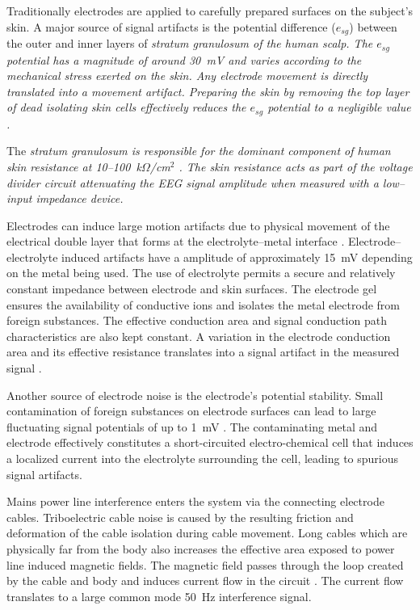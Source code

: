 Traditionally electrodes are applied to carefully prepared surfaces on
the subject's skin. A major source of signal artifacts is the
potential difference ($e_{sg}$) between the outer and inner layers of
\em stratum granulosum \em of the human scalp. The $e_{sg}$ potential has a
magnitude of around 30~mV \cite{reducing-motion-artifacts} and varies
according to the mechanical stress exerted on the skin. Any electrode
movement is directly translated into a movement artifact. Preparing
the skin by removing the top layer of dead isolating skin cells
effectively reduces the $e_{sg}$ potential to a negligible value
\cite{reducing-motion-artifacts}. 


The \em stratum granulosum \em is responsible for the dominant
component of human skin resistance at 10--100~k$\Omega$/cm$^{2}$
\cite{active-electrode-ca}. The skin resistance acts as part of the
voltage divider circuit attenuating the EEG signal amplitude when
measured with a low--input impedance device. 


Electrodes can induce large motion artifacts due to physical movement
of the electrical double layer that forms at the electrolyte--metal
interface \cite{reducing-motion-artifacts}.  Electrode--electrolyte
induced artifacts have a amplitude of approximately 15~mV depending on
the metal being used. The use of electrolyte permits a secure and
relatively constant impedance between electrode and skin surfaces. The
electrode gel ensures the availability of conductive ions and isolates
the metal electrode from foreign substances. The effective conduction
area and signal conduction path characteristics are also kept
constant. A variation in the electrode conduction area and its
effective resistance translates into a signal artifact in the measured
signal \cite{reducing-motion-artifacts}.


Another source of electrode noise is the electrode's potential
stability. Small contamination of foreign substances on electrode
surfaces can lead to large fluctuating signal potentials of up to 1~mV
\cite{electrode-stability}. The contaminating metal and electrode
effectively constitutes a short-circuited electro-chemical cell that
induces a localized current into the electrolyte surrounding the cell,
leading to spurious signal artifacts.


Mains power line interference enters the system via the connecting
electrode cables. Triboelectric cable noise is caused by the resulting
friction and deformation of the cable isolation during cable
movement. Long cables which are physically far from the body also
increases the effective area exposed to power line induced magnetic
fields. The magnetic field passes through the loop created by the
cable and body and induces current flow in the circuit
\cite{reducing-motion-artifacts}. The current flow translates to a large
common mode 50~Hz interference signal.


